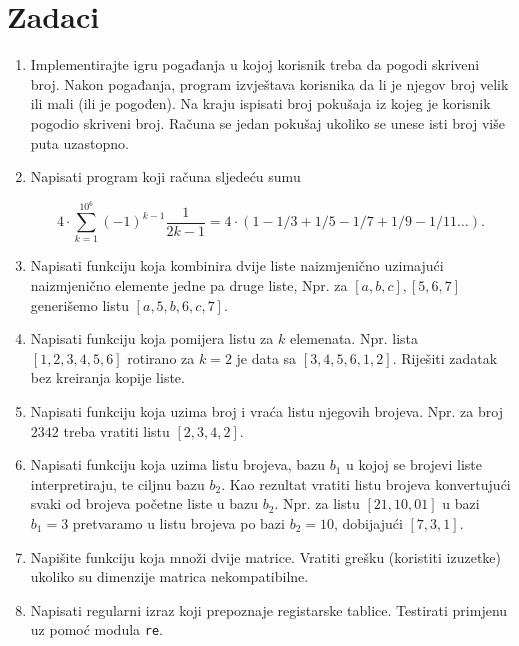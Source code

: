\section*{Zadaci}
\begin{enumerate}
    
    \item Implementirajte igru pogađanja u kojoj korisnik treba da pogodi skriveni broj. Nakon pogađanja, program izvještava korisnika da li je njegov broj velik ili mali (ili je pogođen). Na kraju ispisati broj  pokušaja iz kojeg je korisnik pogodio skriveni broj. Računa se jedan pokušaj ukoliko se unese isti broj više puta uzastopno.
    
    
	\item Napisati program koji računa sljedeću sumu  
	
	$$ 4 \cdot \sum_{k=1}^{10^6}(-1)^{k-1} \frac{1}{2k-1}= 4 \cdot (1-1/3 + 1/5-1/7+1/9-1/11 \ldots).$$
	
	\item Napisati funkciju koja kombinira dvije liste naizmjenično uzimajući naizmjenično elemente jedne pa druge liste, Npr. za $[a,b,c], [5, 6, 7]$ generišemo listu $[a,5,b,6,c,7]$.
	
	\item Napisati funkciju koja pomijera listu za $k$ elemenata. Npr. lista  $[1,2,3,4,5,6]$ rotirano za $k=2$ je data sa $[3,4,5,6,1,2]$. Riješiti zadatak bez kreiranja kopije liste. 
	
	\item Napisati funkciju koja uzima broj i vraća listu njegovih brojeva. Npr. za broj $2342$ treba vratiti listu $[2,3,4,2]$.
	
	\item Napisati funkciju koja uzima listu brojeva,   bazu $b_1$ u kojoj se brojevi liste interpretiraju, te ciljnu bazu $b_2$.  Kao rezultat vratiti listu brojeva konvertujući svaki od brojeva početne liste u bazu $b_2$. Npr. za listu $[21,10,01]$ u bazi $b_1 = 3$ pretvaramo u listu brojeva po bazi $b_2=10$, dobijajući $[7,3, 1]$.
	
	\item Napišite funkciju koja množi dvije matrice. Vratiti grešku (koristiti izuzetke) ukoliko su dimenzije matrica nekompatibilne.  
	 
	\item Napisati regularni izraz koji prepoznaje registarske tablice. Testirati primjenu uz pomoć modula \texttt{re}.
	

\end{enumerate}
